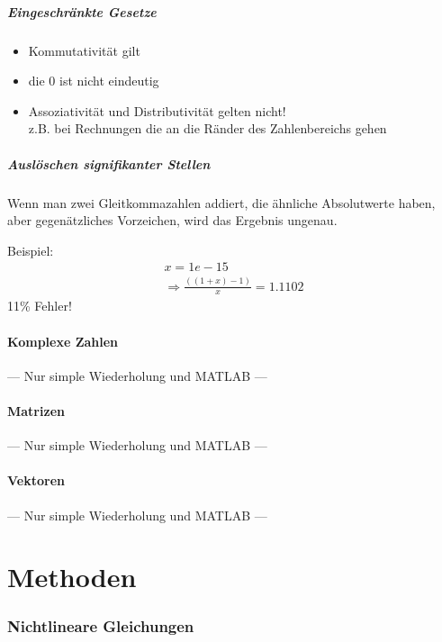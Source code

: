 \documentclass[a4paper, 12pt]{article}
\begin{document}
\subsubsection*{Eingeschränkte Gesetze}
\begin{itemize}
  \item Kommutativität gilt
  \item die 0 ist nicht eindeutig
  \item Assoziativität und Distributivität gelten nicht!\\
    z.B. bei Rechnungen die an die Ränder des Zahlenbereichs gehen
\end{itemize}

\subsubsection*{Auslöschen signifikanter Stellen}
Wenn man zwei Gleitkommazahlen addiert, die ähnliche Absolutwerte haben, aber gegenätzliches Vorzeichen, wird das Ergebnis ungenau.

Beispiel:
\begin{align*}
x = 1e-15\\
\Rightarrow \frac{((1+x)-1)}{x} = 1.1102
\end{align*}
11\% Fehler!


\subsection{Komplexe Zahlen}
--- Nur simple Wiederholung und MATLAB ---


\subsection{Matrizen}
--- Nur simple Wiederholung und MATLAB ---


\subsection{Vektoren}
--- Nur simple Wiederholung und MATLAB ---




\part{Methoden}



\section{Nichtlineare Gleichungen}
\end{document}
